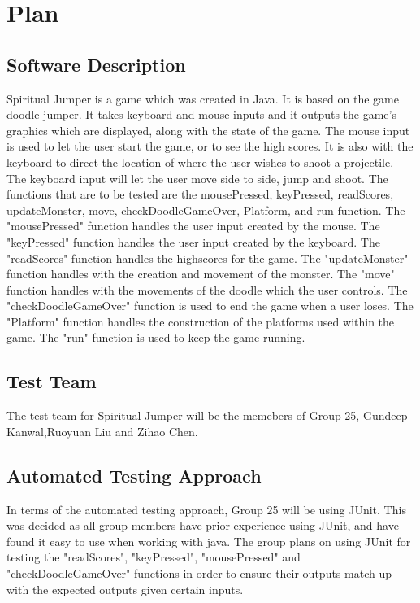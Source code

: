 \documentclass[12pt, titlepage]{article}
\begin{document}
\section{Plan}
	
\subsection{Software Description}

Spiritual Jumper is a game which was created in Java. It is based on the game doodle jumper. It takes keyboard and mouse inputs and it outputs the game's graphics which are displayed, along with the state of the game. The mouse input is used to let the user start the game, or to see the high scores. It is also with the keyboard to direct the location of where the user wishes to shoot a projectile. The keyboard input will let the user move side to side, jump and shoot. The functions that are to be tested are the mousePressed, keyPressed, readScores, updateMonster, move, checkDoodleGameOver, Platform, and run function. The "mousePressed" function handles the user input created by the mouse. The "keyPressed" function handles the user input created by the keyboard. The "readScores" function handles the highscores for the game. The "updateMonster" function handles with the creation and movement of the monster. The "move" function handles with the movements of the doodle which the user controls. The "checkDoodleGameOver" function is used to end the game when a user loses. The "Platform" function handles the construction of the platforms used within the game. The "run" function is used to keep the game running.

\subsection{Test Team}

The test team for Spiritual Jumper will be the memebers of Group 25, Gundeep Kanwal,Ruoyuan Liu and Zihao Chen. 

\subsection{Automated Testing Approach}

In terms of the automated testing approach, Group 25 will be using JUnit. This was decided as all group members have prior experience using JUnit, and have found it easy to use when working with java. The group plans on using JUnit for testing the "readScores", "keyPressed", "mousePressed" and "checkDoodleGameOver" functions in order to ensure their outputs match up with the expected outputs given certain inputs. 
\end{document}
